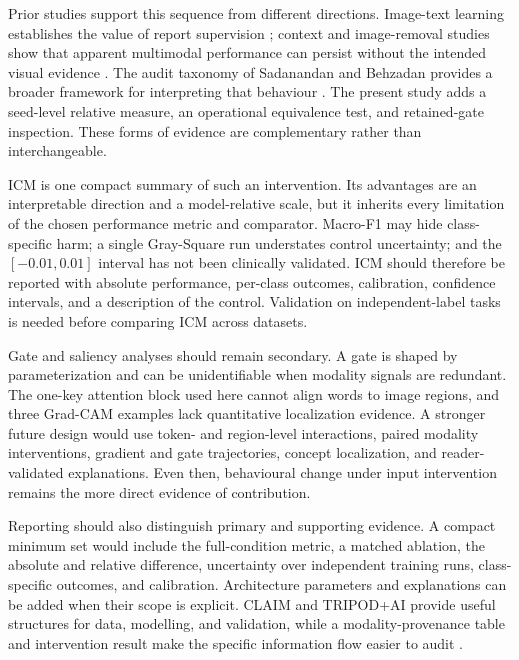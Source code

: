 \documentclass[10pt,a4paper,twocolumn]{article}
\begin{document}
Prior studies support this sequence from different directions. Image-text
learning establishes the value of report supervision
\cite{zhang2022convirt,huang2021gloria,boecking2022textsemantics}; context and
image-removal studies show that apparent multimodal performance can persist
without the intended visual evidence
\cite{wang2026clinicalcontext,lotfinia2026needimage}. The audit taxonomy of
Sadanandan and Behzadan provides a broader framework for interpreting that
behaviour \cite{sadanandan2026consistentdangerous}. The present study adds a
seed-level relative measure, an operational equivalence test, and retained-gate
inspection. These forms of evidence are complementary rather than
interchangeable.

ICM is one compact summary of such an intervention. Its advantages are an
interpretable direction and a model-relative scale, but it inherits every
limitation of the chosen performance metric and comparator. Macro-F1 may hide
class-specific harm; a single Gray-Square run understates control uncertainty;
and the $[-0.01,0.01]$ interval has not been clinically validated. ICM should
therefore be reported with absolute performance, per-class outcomes,
calibration, confidence intervals, and a description of the control. Validation
on independent-label tasks is needed before comparing ICM across datasets.

Gate and saliency analyses should remain secondary. A gate is shaped by
parameterization and can be unidentifiable when modality signals are redundant.
The one-key attention block used here cannot align words to image regions, and
three Grad-CAM examples lack quantitative localization evidence. A stronger
future design would use token- and region-level interactions, paired modality
interventions, gradient and gate trajectories, concept localization, and
reader-validated explanations. Even then, behavioural change under input
intervention remains the more direct evidence of contribution.

Reporting should also distinguish primary and supporting evidence. A compact
minimum set would include the full-condition metric, a matched ablation, the
absolute and relative difference, uncertainty over independent training runs,
class-specific outcomes, and calibration. Architecture parameters and
explanations can be added when their scope is explicit. CLAIM and TRIPOD+AI
provide useful structures for data, modelling, and validation, while a
modality-provenance table and intervention result make the specific information
flow easier to audit \cite{mongan2024claim,collins2024tripodai}.
\end{document}
